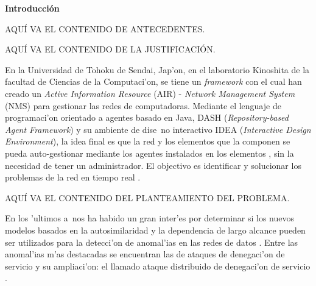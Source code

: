 
\begin{center}
	{\bf Introducci\'on} \label{chap:intro}
\end{center}


\label{sect:motivacion}
\vspace{5 mm}

AQU\'I VA EL CONTENIDO DE ANTECEDENTES. 

\vspace{5 mm}

\label{sect:justificacion}
\vspace{5 mm}

AQU\'I VA EL CONTENIDO DE LA JUSTIFICACI\'ON.
\vspace{5 mm}

En la Universidad de Tohoku de Sendai, Jap'on, en el laboratorio Kinoshita de
la facultad de Ciencias de la Computaci'on, se tiene un {\it framework} con el
cual han creado un {\it Active Information Resource} (AIR) - {\it Network
Management System} (NMS) \cite{kinoshitaNMSAIR} para gestionar las redes de
computadoras. Mediante el lenguaje de programaci'on orientado a agentes
basado en Java, DASH ({\it Repository-based Agent Framework}) y su ambiente
de dise~no interactivo IDEA ({\it Interactive Design Environment}), la idea
final es que la red y los elementos que la componen se pueda auto-gestionar
mediante los agentes instalados en los elementos \cite{545112}, sin la
necesidad de tener un administrador. El objectivo es identificar y solucionar
los problemas de la red en tiempo real \cite{AbarAK04} \cite{KonnoAIK07}.

\vspace{5 mm}


\label{sect:planteamiento}
\vspace{5 mm}

AQU\'I VA EL CONTENIDO DEL PLANTEAMIENTO DEL PROBLEMA.

En los 'ultimos a~nos ha habido un gran inter'es por determinar si los nuevos
modelos basados en la autosimilaridad y la dependencia de largo alcance pueden
ser utilizados para la detecci'on de anomal'ias en las redes de datos
\cite{5475821}. Entre las anomal'ias m'as destacadas se encuentran las de
ataques de denegaci'on de servicio y su ampliaci'on: el llamado ataque
distribuido de denegaci'on de servicio \cite{mingliddos} \cite{xiang:292}.

